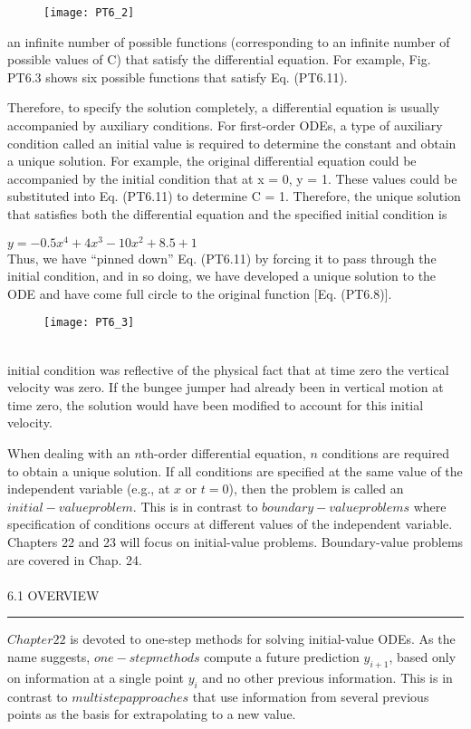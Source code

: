 \documentclass[../main.tex]{subfiles}
\begin{document}
\begin{figure}[hbt!]
	\texttt{[image: PT6\_2]}
	\label{PT6.2}
\end{figure}
an infinite number of possible functions (corresponding to an infinite number of possible
values of C) that satisfy the differential equation. For example, Fig. PT6.3 shows six possible functions that satisfy Eq. (PT6.11).

Therefore, to specify the solution completely, a differential equation is usually accompanied by auxiliary conditions. For first-order ODEs, a type of auxiliary condition called
an initial value is required to determine the constant and obtain a unique solution. For
example, the original differential equation could be accompanied by the initial condition
that at x = 0, y = 1. These values could be substituted into Eq. (PT6.11) to determine
C = 1. Therefore, the unique solution that satisfies both the differential equation and the
specified initial condition is

$y=-0.5x^4 + 4x^3 - 10x^2 + 8.5 + 1$\\
Thus, we have “pinned down” Eq. (PT6.11) by forcing it to pass through the initial condition, and in so doing, we have developed a unique solution to the ODE and have come full
circle to the original function [Eq. (PT6.8)].\\
\begin{figure}[hbt!]
	\texttt{[image: PT6\_3]}
	\label{PT6.3}
\end{figure}\\
initial condition was reflective of the physical fact that at time zero the vertical velocity
was zero. If the bungee jumper had already been in vertical motion at time zero, the solution would have been modified to account for this initial velocity.

When dealing with an $n$th-order differential equation, $n$ conditions are required to obtain a unique solution. If all conditions are specified at the same value of the independent
variable (e.g., at $x$ or $t = 0$), then the problem is called an $initial-value problem$. This is in
contrast to $boundary-value problems$ where specification of conditions occurs at different
values of the independent variable. Chapters 22 and 23 will focus on initial-value problems. Boundary-value problems are covered in Chap. 24.\\
\vspace{0,2 cm}\\
\Large{6.1 \; OVERVIEW}\\
\hrule
\vspace{0,5 cm}
$Chapter 22$ is devoted to one-step methods for solving initial-value ODEs. As the name
suggests, $one-step methods$ compute a future prediction $y_{i+1}$, based only on information at
a single point $y_{i}$ and no other previous information. This is in contrast to $multistep approaches$ that use information from several previous points as the basis for extrapolating to
a new value.
\end{document}
